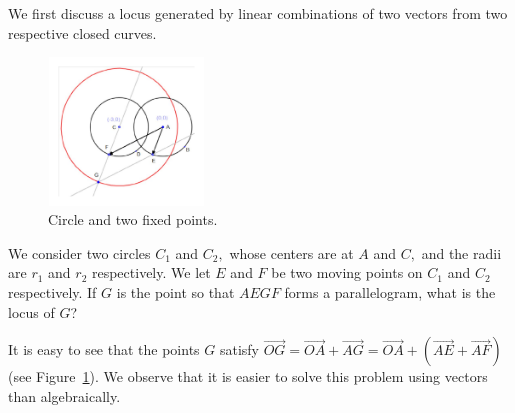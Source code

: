 \documentclass[12pt,a4paper]{article}%
\begin{document}
We first discuss a locus generated by linear combinations of two vectors from
two respective closed curves.
\begin{figure}[htbp]
\begin{center}
 \includegraphics[natheight=4.522700in,natwidth=4.779100in,height=1.5469in,width=1.6329in]{PJH75H18.pdf}
\end{center}
 \caption{Circle and two fixed points.}
 \label{fig5}
\end{figure}

We consider two circles $C_{1}$ and $C_{2},$ whose centers are at $A$ and $C,
$ and the radii are $r_{1}$ and $r_{2}$ respectively. We let $E$ and $F$ be
two moving points on $C_{1}$ and $C_{2}$ respectively. If $G$ is the point
so that $AEGF$ forms a parallelogram, what is the locus of $G$?

It is easy to see that the points $G$ satisfy $\overrightarrow{OG}=\overrightarrow{OA}
+\overrightarrow{AG}=\overrightarrow{OA}+\left(  \overrightarrow
{AE}+\overrightarrow{AF}\right)  $ (see Figure~\ref{fig5}).
We observe that it is easier to solve this problem using vectors than
algebraically.
\end{document}
